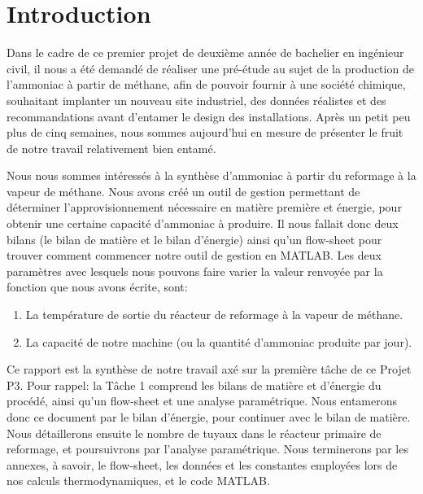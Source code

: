 \section{Introduction}

Dans le cadre de ce premier projet de deuxième année de bachelier en ingénieur civil, il nous a été demandé
de réaliser une pré-étude au sujet de la production de l’ammoniac à partir de méthane, afin de pouvoir fournir
à une société chimique, souhaitant implanter un nouveau site industriel, des données réalistes et des recommandations
avant d’entamer le design des installations. Après un petit peu plus de cinq semaines, nous sommes aujourd'hui en
mesure de présenter le fruit de notre travail relativement bien entamé. 

Nous nous sommes intéressés à la synthèse d’ammoniac à partir du reformage à la vapeur de méthane. Nous avons
créé un outil de gestion permettant de déterminer l’approvisionnement nécessaire en matière première et énergie, pour
obtenir une certaine capacité d'ammoniac à produire. Il nous fallait donc deux bilans (le bilan de matière et le
bilan d'énergie) ainsi qu'un flow-sheet pour trouver comment commencer notre outil de gestion en \textsc{MATLAB}. Les
deux paramètres avec lesquels nous pouvons faire varier la valeur renvoyée par la fonction que nous avons écrite, sont:

\begin{enumerate}
\item La température de sortie du réacteur de reformage à la vapeur de méthane.
\item La capacité de notre machine (ou la quantité d'ammoniac  produite par jour).
\end{enumerate}


Ce rapport est la synthèse de notre travail axé sur la première tâche de ce Projet P3. Pour rappel: la Tâche 1 comprend
les bilans de matière et d’énergie du procédé, ainsi qu'un flow-sheet et une analyse paramétrique. Nous entamerons donc ce
document par le bilan d'énergie, pour continuer avec le bilan de matière. Nous détaillerons ensuite le nombre de tuyaux
dans le réacteur primaire de reformage, et poursuivrons par l'analyse paramétrique. Nous terminerons par les annexes, à
savoir, le flow-sheet, les données et les constantes employées lors de nos calculs thermodynamiques, et le code \textsc{MATLAB}.		
